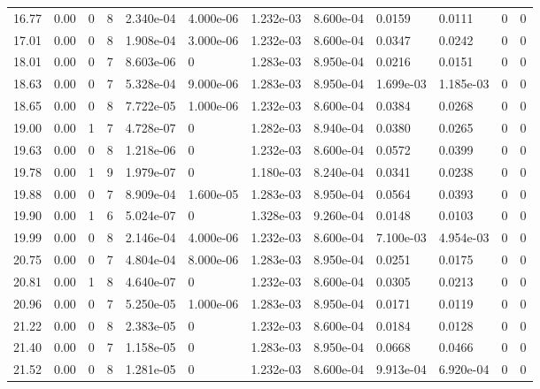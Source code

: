 \documentclass[preview]{standalone}
\begin{document}
{{{\begin{tabular}{L{1.2cm}C{1.2cm} C{0.3cm}C{0.5cm} C{1.4cm}C{1.4cm} C{1.4cm}C{1.4cm} C{1.6cm}C{1.6cm} C{1.6cm}C{1.6cm}}
  16.77  &  0.00  & 0     &  8 &  2.340e-04  & 4.000e-06  &  1.232e-03&   8.600e-04& 0.0159 & 0.0111   &  0 & 0  \\ 
  17.01  &  0.00  & 0     &  8 &  1.908e-04  & 3.000e-06  &  1.232e-03&   8.600e-04& 0.0347 & 0.0242   &  0 & 0  \\ 
  18.01  &  0.00  & 0     &  7 &  8.603e-06  & 0  &  1.283e-03&   8.950e-04& 0.0216 & 0.0151   &  0 & 0  \\ 
  18.63  &  0.00  & 0     &  7 &  5.328e-04  & 9.000e-06  &  1.283e-03&   8.950e-04& 1.699e-03 & 1.185e-03   &  0 & 0  \\ 
  18.65  &  0.00  & 0     &  8 &  7.722e-05  & 1.000e-06  &  1.232e-03&   8.600e-04& 0.0384 & 0.0268   &  0 & 0  \\ 
  19.00  &  0.00  & 1     &  7 &  4.728e-07  & 0  &  1.282e-03&   8.940e-04& 0.0380 & 0.0265   &  0 & 0  \\ 
  19.63  &  0.00  & 0     &  8 &  1.218e-06  & 0  &  1.232e-03&   8.600e-04& 0.0572 & 0.0399   &  0 & 0  \\ 
  19.78  &  0.00  & 1     &  9 &  1.979e-07  & 0  &  1.180e-03&   8.240e-04& 0.0341 & 0.0238   &  0 & 0  \\ 
  19.88  &  0.00  & 0     &  7 &  8.909e-04  & 1.600e-05  &  1.283e-03&   8.950e-04& 0.0564 & 0.0393   &  0 & 0  \\ 
  19.90  &  0.00  & 1     &  6 &  5.024e-07  & 0  &  1.328e-03&   9.260e-04& 0.0148 & 0.0103   &  0 & 0  \\ 
  19.99  &  0.00  & 0     &  8 &  2.146e-04  & 4.000e-06  &  1.232e-03&   8.600e-04& 7.100e-03 & 4.954e-03   &  0 & 0  \\ 
  20.75  &  0.00  & 0     &  7 &  4.804e-04  & 8.000e-06  &  1.283e-03&   8.950e-04& 0.0251 & 0.0175   &  0 & 0  \\ 
  20.81  &  0.00  & 1     &  8 &  4.640e-07  & 0  &  1.232e-03&   8.600e-04& 0.0305 & 0.0213   &  0 & 0  \\ 
  20.96  &  0.00  & 0     &  7 &  5.250e-05  & 1.000e-06  &  1.283e-03&   8.950e-04& 0.0171 & 0.0119   &  0 & 0  \\ 
  21.22  &  0.00  & 0     &  8 &  2.383e-05  & 0  &  1.232e-03&   8.600e-04& 0.0184 & 0.0128   &  0 & 0  \\ 
  21.40  &  0.00  & 0     &  7 &  1.158e-05  & 0  &  1.283e-03&   8.950e-04& 0.0668 & 0.0466   &  0 & 0  \\ 
  21.52  &  0.00  & 0     &  8 &  1.281e-05  & 0  &  1.232e-03&   8.600e-04& 9.913e-04 & 6.920e-04   &  0 & 0  \\ 

\end{tabular}}}}
\end{document}
